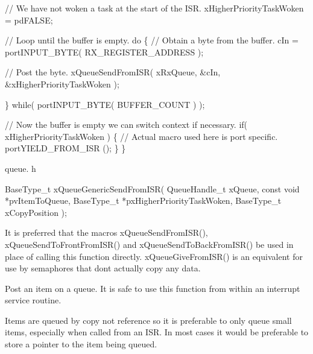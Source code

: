 \begin{DoxyPre}   // We have not woken a task at the start of the ISR.
   xHigherPriorityTaskWoken = pdFALSE;\end{DoxyPre}



\begin{DoxyPre}   // Loop until the buffer is empty.
   do
   \{
    // Obtain a byte from the buffer.
    cIn = portINPUT\_BYTE( RX\_REGISTER\_ADDRESS );\end{DoxyPre}



\begin{DoxyPre}    // Post the byte.
    xQueueSendFromISR( xRxQueue, &cIn, &xHigherPriorityTaskWoken );\end{DoxyPre}



\begin{DoxyPre}   \} while( portINPUT\_BYTE( BUFFER\_COUNT ) );\end{DoxyPre}



\begin{DoxyPre}   // Now the buffer is empty we can switch context if necessary.
   if( xHigherPriorityTaskWoken )
   \{
    // Actual macro used here is port specific.
    portYIELD\_FROM\_ISR ();
   \}
\}
\end{DoxyPre}


queue. h 
\begin{DoxyPre}
BaseType\_t xQueueGenericSendFromISR(
                                       QueueHandle\_t        xQueue,
                                       const    void    *pvItemToQueue,
                                       BaseType\_t   *pxHigherPriorityTaskWoken,
                                       BaseType\_t   xCopyPosition
                                   );
\end{DoxyPre}


It is preferred that the macros x\+Queue\+Send\+From\+I\+S\+R(), x\+Queue\+Send\+To\+Front\+From\+I\+S\+R() and x\+Queue\+Send\+To\+Back\+From\+I\+S\+R() be used in place of calling this function directly. x\+Queue\+Give\+From\+I\+S\+R() is an equivalent for use by semaphores that don\textquotesingle{}t actually copy any data.

Post an item on a queue. It is safe to use this function from within an interrupt service routine.

Items are queued by copy not reference so it is preferable to only queue small items, especially when called from an I\+S\+R. In most cases it would be preferable to store a pointer to the item being queued.


